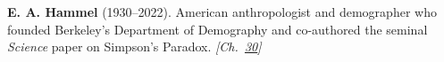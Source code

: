 \textbf{E. A. Hammel} (1930–2022). American anthropologist and demographer who founded Berkeley's Department of Demography and co-authored the seminal \emph{Science} paper on Simpson's Paradox. \emph{[Ch.~\hyperref[ch:simpsonsparadox]{30}]}

